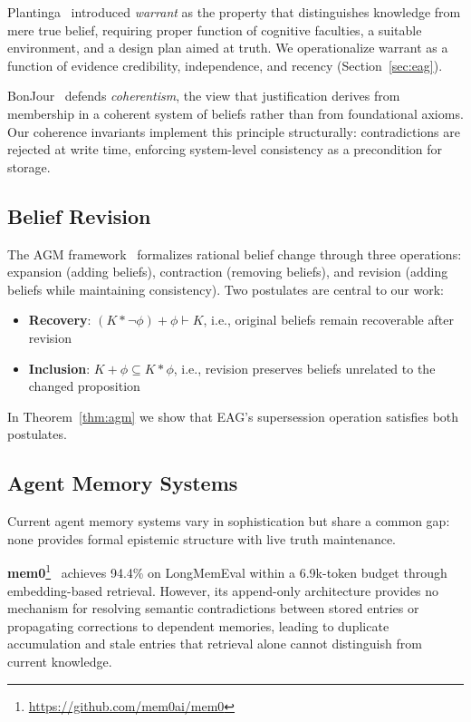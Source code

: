 \documentclass[11pt,letterpaper]{article}
\begin{document}
Plantinga~\cite{plantinga1993} introduced \textit{warrant} as the property that distinguishes knowledge from mere true belief, requiring proper function of cognitive faculties, a suitable environment, and a design plan aimed at truth. We operationalize warrant as a function of evidence credibility, independence, and recency (Section~\ref{sec:eag}).

BonJour~\cite{bonjour1985} defends \textit{coherentism}, the view that justification derives from membership in a coherent system of beliefs rather than from foundational axioms. Our coherence invariants implement this principle structurally: contradictions are rejected at write time, enforcing system-level consistency as a precondition for storage.

\subsection{Belief Revision}

The AGM framework~\cite{agm1985} formalizes rational belief change through three operations: expansion (adding beliefs), contraction (removing beliefs), and revision (adding beliefs while maintaining consistency). Two postulates are central to our work:
\begin{itemize}[noitemsep]
    \item \textbf{Recovery}: $(K * \neg\phi) + \phi \vdash K$, i.e., original beliefs remain recoverable after revision
    \item \textbf{Inclusion}: $K + \phi \subseteq K * \phi$, i.e., revision preserves beliefs unrelated to the changed proposition
\end{itemize}

In Theorem~\ref{thm:agm} we show that EAG's supersession operation satisfies both postulates.

\subsection{Agent Memory Systems}

Current agent memory systems vary in sophistication but share a common gap: none provides formal epistemic structure with live truth maintenance.

\textbf{mem0}\footnote{\url{https://github.com/mem0ai/mem0}}~\cite{mem0} achieves 94.4\% on LongMemEval within a 6.9k-token budget through embedding-based retrieval. However, its append-only architecture provides no mechanism for resolving semantic contradictions between stored entries or propagating corrections to dependent memories, leading to duplicate accumulation and stale entries that retrieval alone cannot distinguish from current knowledge.
\end{document}
